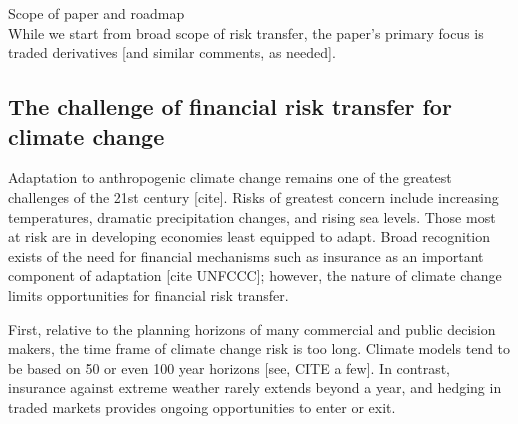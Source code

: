 \documentclass[authoryear]{article}
\begin{document}
Scope of paper and roadmap \\
While we start from broad scope of risk transfer, the paper's primary focus is traded derivatives [and similar comments, as needed].


\subsection{The challenge of financial risk transfer for climate change}
Adaptation to anthropogenic climate change remains one of the greatest challenges of the 21st century [cite]. Risks of greatest concern include increasing temperatures, dramatic precipitation changes, and rising sea levels. Those most at risk are in developing economies least equipped to adapt. Broad recognition exists of the need for financial mechanisms such as insurance as an important component of adaptation [cite UNFCCC]; however, the nature of climate change limits opportunities for financial risk transfer.

First, relative to the planning horizons of many commercial and public decision makers, the time frame of climate change risk is too long. Climate models tend to be based on 50 or even 100 year horizons [see, CITE a few]. In contrast, insurance against extreme weather rarely extends beyond a year, and hedging in traded markets provides ongoing opportunities to enter or exit.
\end{document}
